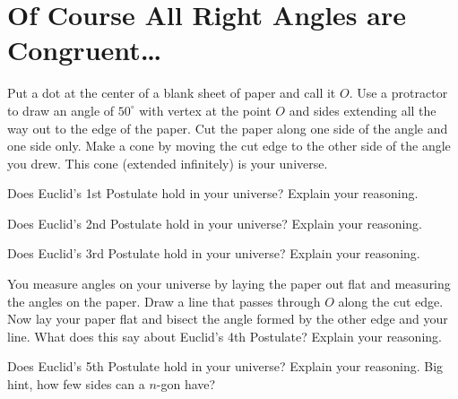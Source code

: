 \newpage
\section{Of Course All Right Angles are Congruent\dots}	


\begin{prob}
Put a dot at the center of a blank sheet of paper and call it $O$.
Use a protractor to draw an angle of $50^\circ$ with vertex at the
point $O$ and sides extending all the way out to the edge of the
paper.  Cut the paper along one side of the angle and one side only.
Make a cone by moving the cut edge to the other side of the angle you
drew.  This cone (extended infinitely) is your universe.
\end{prob}


\begin{prob}
Does Euclid's 1st Postulate hold in your universe? Explain your reasoning.
\end{prob}

\begin{prob}
Does Euclid's 2nd Postulate hold in your universe? Explain your reasoning.
\end{prob}

\begin{prob}
Does Euclid's 3rd Postulate hold in your universe? Explain your reasoning.
\end{prob}

\begin{prob}
You measure angles on your universe by laying the paper out flat and
measuring the angles on the paper. Draw a line that passes through $O$
along the cut edge. Now lay your paper flat and bisect the angle
formed by the other edge and your line. What does this say about
Euclid's 4th Postulate? Explain your reasoning.
\end{prob}



\begin{prob}
Does Euclid's 5th Postulate hold in your universe? Explain your
reasoning. Big hint, how few sides can a $n$-gon have?
\end{prob}
